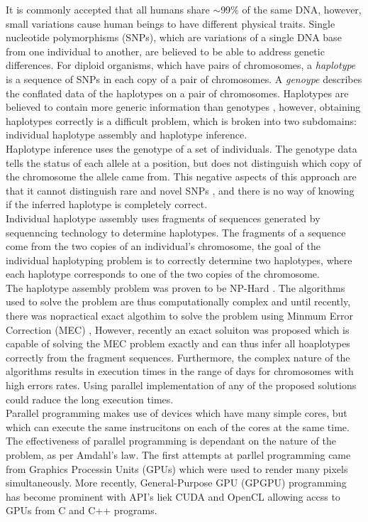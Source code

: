\documentclass[10pt,twocolumn]{witseiepaper}
\begin{document}
It is commonly accepted that all humans share $\mathtt{\sim}$99$\%$ of the same DNA, however, small variations 
cause human beings to have different physical traits. Single nucleotide polymorphisms (SNPs), which are
variations of a single DNA base from one individual to another, are believed to be able to address
genetic differences. For diploid organisms, which have pairs of chromosomes, a \textit{haplotype} is a 
sequence of SNPs in each copy of a pair of chromosomes. A \textit{genoype} describes the conflated data of the
haplotypes on a pair of chromosomes. Haplotypes are believed to contain more generic information than
genotypes \cite{stephens:2001}, however, obtaining haplotypes correctly is a difficult problem, which is 
broken into two subdomains: individual haplotype assembly and haplotype inference. \\
Haplotype inference uses the genotype of a set of individuals. The genotype data tells the status of each
allele at a position, but does not distinguish which copy of the chromosome the allele came from.
This negative aspects of this approach are that it cannot distinguish rare and novel SNPs \cite{he:2010}, 
and there is no way of knowing if the inferred haplotype is completely correct. \\
Individual haplotype assembly uses fragments of sequences generated by sequenncing technology to determine
haplotypes. The fragments of a sequence come from the two copies of an individual's chromosome, the goal of the
individual haplotyping problem is to correctly determine two haplotypes, where each haplotype corresponds to
one of the two copies of the chromosome. \\
The haplotype assembly problem was proven to be NP-Hard \cite{lippert:2002}. The algorithms used to solve the
problem are thus computationally complex and until recently, there was nopractical exact algothim to solve 
the problem using Minmum Error Correction (MEC) \cite{bonizzoni:2003},
However, recently an exact soluiton was proposed \cite{chen:2013} which is capable of solving the MEC 
problem exactly and can thus infer all hoaplotypes correctly from the fragment sequences. Furthermore, the
complex nature of the algorithms results in execution times in the range of days for chromosomes with high
errors rates. Using parallel implementation of any of the proposed solutions could raduce the long execution 
times. \\
Parallel programming makes use of devices which have many simple cores, but which can execute the same
instrucitons on each of the cores at the same time. The effectiveness of parallel programming is dependant on
the nature of the problem, as per Amdahl's law. The first attempts at parllel programming came from Graphics
Processin Units (GPUs) which were used to render many pixels simultaneously. More recently, General-Purpose
GPU (GPGPU) programming has become prominent with API's liek CUDA and OpenCL allowing accss to GPUs from C and
C++ programs. \\
\end{document}
